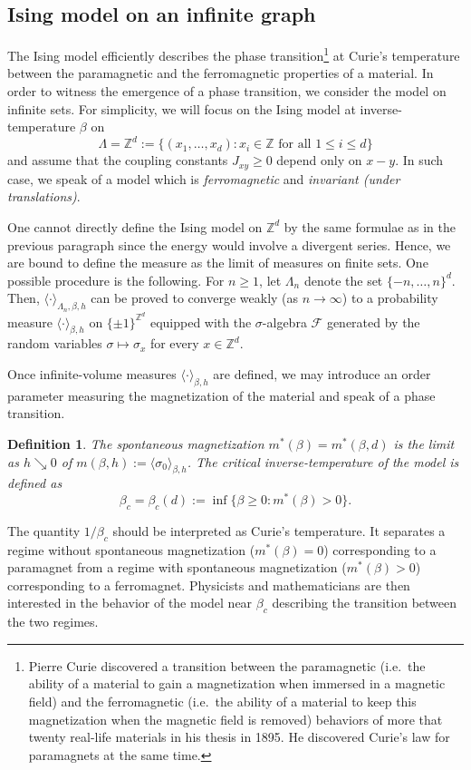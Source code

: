 \documentclass[a4paper,oneside,11pt]{article}
\newtheorem{definition}[theorem]{Definition}
\newcommand{\ee}{\end{equation}}
\newcommand{\be}{\begin{equation}}
\begin{document}
\subsection{Ising model on an infinite graph}The Ising model efficiently describes the phase transition\footnote{Pierre Curie discovered a transition between the paramagnetic (i.e.~the ability of a material to gain a magnetization when immersed in a magnetic field) and the ferromagnetic (i.e.~the ability of a material to keep this magnetization when the magnetic field is removed) behaviors of more that twenty real-life materials in his thesis in 1895. He discovered Curie's law for paramagnets at the same time.}  at Curie's temperature between the paramagnetic and the ferromagnetic properties of a material. 
In order to witness the emergence of a phase transition, we consider the model on infinite sets. For simplicity, we will focus on the Ising model at inverse-temperature $\beta$ on
$$\Lambda=\mathbb  Z^d:=\big\{(x_1,\dots,x_d):x_i\in \mathbb  Z\text{ for all }1\le i\le d\big\}$$
and assume that the coupling constants $J_{xy}\ge0$ depend only on $x-y$. In such case, we speak of a model which is {\em ferromagnetic} and {\em invariant (under translations)}. 

One cannot directly define the Ising model on $\mathbb Z^d$ by the same formulae as in the previous paragraph since the energy would involve a divergent series. Hence, we are bound to define the measure as the limit of measures on finite sets. One possible procedure is the following. For $n\ge1$, let $\Lambda_n$ denote the set $\{-n,\dots,n\}^d$. Then, $\langle\cdot\rangle_{\Lambda_n,\beta,h}$ can be proved to converge weakly (as $n\rightarrow\infty$) to a probability measure $\langle\cdot\rangle_{\beta,h}$ on $\{\pm1\}^{\mathbb Z^d}$ equipped with the $\sigma$-algebra $\mathcal F$ generated by the random variables $\sigma\mapsto \sigma_x$ for every $x\in \mathbb Z^d$.

Once infinite-volume measures $\langle\cdot\rangle_{\beta,h}$ are defined, we may introduce an order parameter measuring the magnetization of the material and speak of a phase transition.

\begin{definition} The {\em spontaneous magnetization} $m^*(\beta)=m^*(\beta,d)$ is the limit as $h\searrow 0$ of $m(\beta,h):=\langle \sigma_0\rangle_{\beta,h}$. The {\em critical inverse-temperature} of the model is defined as
\be\beta_c=\beta_c(d):=\inf\{\beta\ge0:m^*(\beta)>0\}.\ee
\end{definition}
The quantity $1/\beta_c$ should be interpreted as Curie's temperature. It separates a regime without spontaneous magnetization ($m^*(\beta)=0$) corresponding to a paramagnet from a regime with spontaneous magnetization ($m^*(\beta)>0$) corresponding to a ferromagnet. Physicists and mathematicians are then interested in the behavior of the model near $\beta_c$ describing the transition between the two regimes. 
\end{document}
